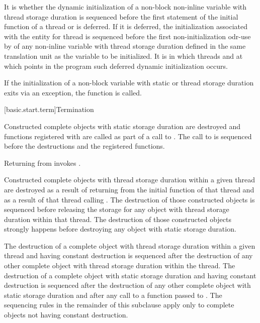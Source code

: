 \pnum
It is 
whether the dynamic initialization of a
non-block non-inline variable with thread storage duration
is sequenced before the first statement of the initial function of a thread or is deferred.
If it is deferred,
the initialization associated with the entity for thread 
is sequenced before the first non-initialization odr-use by 
of any non-inline variable with thread storage duration
defined in the same translation unit as the variable to be initialized.
It is 
in which threads and at which points in the program such deferred dynamic initialization occurs.

\pnum
If the initialization of
a non-block variable with static or thread storage duration
exits via an exception,
the function  is called.%

[basic.start.term]{Termination}

\pnum
{}%
%
%
Constructed complete objects
with static storage duration are destroyed
and functions registered with 
are called as part of a call to
%
%
.
The call to  is sequenced before
the destructions and the registered functions.
\begin{note}
Returning from  invokes .
\end{note}

\pnum
Constructed complete objects with thread storage duration within a given thread
are destroyed as a result of returning from the initial function of that thread and as a
result of that thread calling .
The destruction of those constructed objects
is sequenced before releasing the storage for
any object with thread storage duration within that thread.
The destruction of those constructed objects
strongly happens before destroying
any object with static storage duration.

\pnum
The destruction of a complete object with thread storage duration within a given thread
and having constant destruction
is sequenced after the destruction of any other complete object
with thread storage duration within the thread.
The destruction of a complete object with static storage duration
and having constant destruction
is sequenced after the destruction of any other complete object
with static storage duration
and after any call to a function passed to .
The sequencing rules in the remainder of this subclause
apply only to complete objects not having constant destruction.

